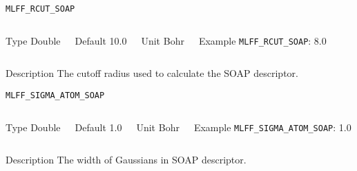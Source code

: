 \begin{frame}[allowframebreaks]{\texttt{{MLFF\_RCUT\_SOAP}}} \label{MLFF_RCUT_SOAP}
\vspace*{-12pt}
\begin{columns}
\begin{block}{Type}
Double
\end{block}

\begin{block}{Default}
10.0
\end{block}

\begin{block}{Unit}
Bohr
\end{block}

\begin{block}{Example}
\texttt{MLFF\_RCUT\_SOAP}: 8.0
\end{block}
\end{columns}

\begin{block}{Description}
 The cutoff radius used to calculate the SOAP descriptor. 
\end{block}

%
\end{frame}

\begin{frame}[allowframebreaks]{\texttt{{MLFF\_SIGMA\_ATOM\_SOAP}}} \label{MLFF_SIGMA_ATOM_SOAP}
\vspace*{-12pt}
\begin{columns}
\begin{block}{Type}
Double
\end{block}

\begin{block}{Default}
1.0
\end{block}

\begin{block}{Unit}
Bohr
\end{block}

\begin{block}{Example}
\texttt{MLFF\_SIGMA\_ATOM\_SOAP}: 1.0
\end{block}
\end{columns}

\begin{block}{Description}
 The width of Gaussians in SOAP descriptor. 
\end{block}

%
\end{frame}

